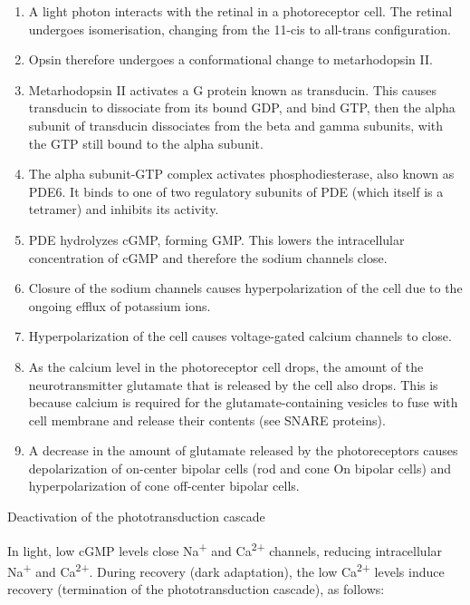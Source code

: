 \begin{enumerate}
\def\labelenumi{\arabic{enumi}.}
\tightlist
\item
  A light photon interacts with the retinal in a photoreceptor cell. The retinal undergoes isomerisation, changing from the 11-cis to all-trans configuration.
\item
  Opsin therefore undergoes a conformational change to metarhodopsin II.
\item
  Metarhodopsin II activates a G protein known as transducin. This causes transducin to dissociate from its bound GDP, and bind GTP, then the alpha subunit of transducin dissociates from the beta and gamma subunits, with the GTP still bound to the alpha subunit.
\item
  The alpha subunit-GTP complex activates phosphodiesterase, also known as PDE6. It binds to one of two regulatory subunits of PDE (which itself is a tetramer) and inhibits its activity.
\item
  PDE hydrolyzes cGMP, forming GMP. This lowers the intracellular concentration of cGMP and therefore the sodium channels close.
\item
  Closure of the sodium channels causes hyperpolarization of the cell due to the ongoing efflux of potassium ions.
\item
  Hyperpolarization of the cell causes voltage-gated calcium channels to close.
\item
  As the calcium level in the photoreceptor cell drops, the amount of the neurotransmitter glutamate that is released by the cell also drops. This is because calcium is required for the glutamate-containing vesicles to fuse with cell membrane and release their contents (see SNARE proteins).
\item
  A decrease in the amount of glutamate released by the photoreceptors causes depolarization of on-center bipolar cells (rod and cone On bipolar cells) and hyperpolarization of cone off-center bipolar cells.
\end{enumerate}

Deactivation of the phototransduction cascade

In light, low cGMP levels close Na\textsuperscript{+} and Ca\textsuperscript{2+} channels, reducing intracellular Na\textsuperscript{+} and Ca\textsuperscript{2+}. During recovery (dark adaptation), the low Ca\textsuperscript{2+} levels induce recovery (termination of the phototransduction cascade), as follows:

